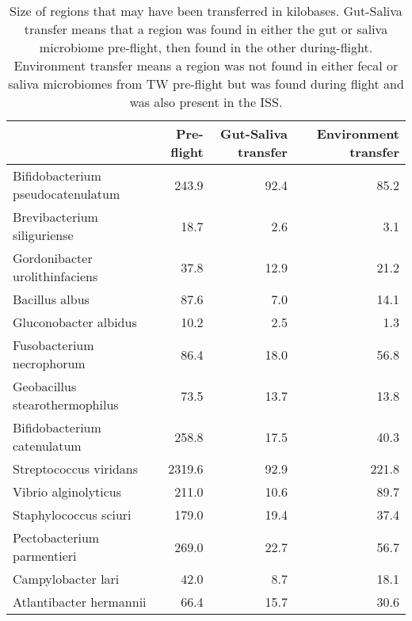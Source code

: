 \begin{table}[]
\centering
\caption{Size of regions that may have been transferred in kilobases. Gut-Saliva transfer means that a region was found in either the gut or saliva microbiome pre-flight, then found in the other during-flight. Environment transfer means a region was not found in either fecal or saliva microbiomes from TW pre-flight but was found during flight and was also present in the ISS.}
\label{tbl:covcounts}
\begin{tabular}{lrrr}
\toprule
{} &  Pre-flight &  Gut-Saliva transfer &  Environment transfer \\
\midrule
Bifidobacterium pseudocatenulatum &                  243.9 &                 92.4 &                  85.2 \\
Brevibacterium siliguriense       &                   18.7 &                  2.6 &                   3.1 \\
Gordonibacter urolithinfaciens    &                   37.8 &                 12.9 &                  21.2 \\
Bacillus albus                    &                   87.6 &                  7.0 &                  14.1 \\
Gluconobacter albidus             &                   10.2 &                  2.5 &                   1.3 \\
Fusobacterium necrophorum         &                   86.4 &                 18.0 &                  56.8 \\
Geobacillus stearothermophilus    &                   73.5 &                 13.7 &                  13.8 \\
Bifidobacterium catenulatum       &                  258.8 &                 17.5 &                  40.3 \\
Streptococcus viridans            &                 2319.6 &                 92.9 &                 221.8 \\
Vibrio alginolyticus              &                  211.0 &                 10.6 &                  89.7 \\
Staphylococcus sciuri             &                  179.0 &                 19.4 &                  37.4 \\
Pectobacterium parmentieri        &                  269.0 &                 22.7 &                  56.7 \\
Campylobacter lari                &                   42.0 &                  8.7 &                  18.1 \\
Atlantibacter hermannii           &                   66.4 &                 15.7 &                  30.6 \\

\end{tabular}
\end{table}
